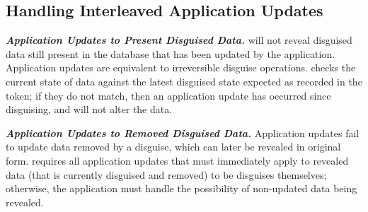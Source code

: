 \iffalse
%
%

\subsection{Handling Interleaved Application Updates}
\noindent\textbf{\emph{Application Updates to Present Disguised Data.}}
\sys will not reveal disguised data still present in the database that has been updated by the
application. Application updates are equivalent to irreversible disguise operations.
\sys checks the current state of data against the latest disguised state
expected as recorded in the token; if they do not match, then an application update has occurred
since disguising, and \sys will not alter the data.

\vspace{6pt}\noindent\textbf{\emph{Application Updates to Removed Disguised Data.}}
Application updates fail to update data removed by a disguise, which can later be revealed in
original form.
\sys requires all application updates that must immediately apply to revealed data (that is
currently disguised and removed) to be disguises themselves; otherwise, the application must handle
the possibility of non-updated data being revealed.

